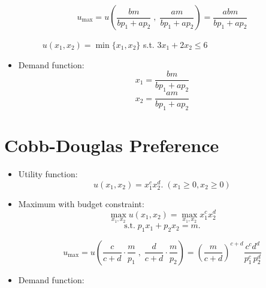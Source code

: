 \documentclass[
12pt, %
a4paper, %
onecolumn, %
portrait %
]{article}
\begin{document}
\begin{itemize}
	\[
	u_{\max}=u\left(\frac{bm}{bp_1+ap_2}\;,\;\frac{am}{bp_1+ap_2}\right)=\frac{abm}{bp_1+ap_2}
	\]
	\begin{figure}[H]
		\centering
		\caption{$u(x_1,x_2)=\min\{x_1,x_2\}$ s.t. $3x_1+2x_2\le 6$}
		\label{Fig.lable}
	\end{figure}
	
	
	
	\item Demand function:
	\[
	x_1=\frac{bm}{bp_1+ap_2}
	\]
	\[
	x_2=\frac{am}{bp_1+ap_2}
	\]
	
\end{itemize}





\section{Cobb-Douglas Preference}

\begin{itemize}
	\item Utility function:
	\[
	u(x_1,x_2)=x_1^cx_2^d.\;(x_1\ge0,x_2\ge 0)
	\]
	
	\item Maximum with budget constraint:
	\[
	\max_{x_1,x_2} u(x_1,x_2)=\max_{x_1,x_2}x_1^cx_2^d
	\]
	\[
	\text{s.t.}\;p_1x_1+p_2x_2=m.
	\]
	
	\[
	u_{\max}=u\left(\frac{c}{c+d}\cdot\frac{m}{p_1}\;,\;\frac{d}{c+d}\cdot\frac{m}{p_2}\right)=\left(\frac{m}{c+d}\right)^{c+d}\frac{c^cd^d}{p_1^c\,p_2^d}
	\]
	\item Demand function:
\end{itemize}
\end{document}
